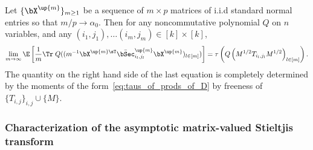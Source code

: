 Let $\{\bX^\up{m}\}_{m\ge 1}$ be a sequence of $m\times p$ matrices of i.i.d standard normal entries so that
$m/p \to \alpha_0$.
Then for any noncommutative polynomial $Q$ on $n$ variables, and any $(i_1,j_1),\dots (i_m,j_m) \in [k]\times [k]$,
\begin{equation}
\label{eq:moment_convergence}
    \lim_{m\to\infty}  \E\left[\frac1m\Tr\; Q( ( m^{-1}\bX^{\up{m}\sT} \bar \bSec_{i_l,j_l}^\up{m}\bX^\up{m})_{l\in[m]})\right] =  \tau\left( Q\left( M^{1/2} T_{i_l,j_l} M^{1/2}\right)_{l\in[m]} \right).
\end{equation}
 The quantity on the right hand side of the last equation is completely determined by the moments of the 
 form~\eqref{eq:taus_of_prods_of_D} by freeness of $\{T_{i,j}\}_{i,j} \cup \{M\}$.

\subsubsection{Characterization of the asymptotic matrix-valued Stieltjis transform}


